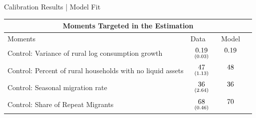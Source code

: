 \documentclass[9pt,pdftex,aspectratio=1610]{beamer}
\theoremstyle{definition}
\begin{document}
\begin{frame}[t]{Calibration Results | Model Fit}
\begin{table}[!t]
\footnotesize
\setlength {\tabcolsep}{2.95mm}
\renewcommand{\arraystretch}{1.}
\begin{center}
\begin{tabular}{l l c c}
\multicolumn{4}{c}{\textbf{\small Moments Targeted in the Estimation}}\\
\hline
\hline
Moments & Data & Model \\
\hline
Control: Variance of rural log consumption growth & $\begin{array}{c}0.19\vspace{-.15cm}\\ \scriptstyle (0.03)\end{array}$
& $\begin{array}{c}0.19\vspace{-.15cm}\\ \scriptstyle \phantom{(0.03)}\end{array}$\\

Control: Percent of rural households with no liquid assets &
$\begin{array}{c}47\vspace{-.15cm}\\ \scriptstyle (1.13)\end{array}$ &
$\begin{array}{c}48\vspace{-.15cm}\\ \scriptstyle \phantom{(1.13)}\end{array}$\\

Control: Seasonal migration rate &
$\begin{array}{c}36\vspace{-.15cm}\\ \scriptstyle (2.64)\end{array}$ &
$\begin{array}{c}36\vspace{-.15cm}\\ \scriptstyle \phantom{(2.64)}\end{array}$ &\\

 Control: Share of Repeat Migrants&
$\begin{array}{c}68\vspace{-.15cm}\\ \scriptstyle (0.46)\end{array}$ &
$\begin{array}{c}70\vspace{-.15cm}\\ \scriptstyle \phantom{(0.46)}\end{array}$ & \\


\end{tabular}
\end{center}
\end{table}
\end{frame}
\end{document}

